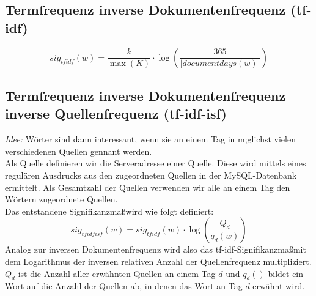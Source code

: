 \subsection{Termfrequenz inverse Dokumentenfrequenz (tf-idf)}
 \begin{equation}
sig_{tf idf}(w) = \frac{k}{\max(K)} \cdot \log ( \frac{365}{|documentdays(w)|})
\end{equation}

\subsection{Termfrequenz inverse Dokumentenfrequenz inverse Quellenfrequenz (tf-idf-isf)}
\emph{Idee: } W\"orter sind dann interessant, wenn sie an einem Tag in m;glichst vielen verschiedenen Quellen gennant werden.\\
Als Quelle definieren wir die Serveradresse einer Quelle. Diese wird mittels eines regul\"aren Ausdrucks aus den zugeordneten Quellen in der MySQL-Datenbank ermittelt. Als Gesamtzahl der Quellen verwenden wir alle an einem Tag den W\"ortern zugeordnete Quellen.\\
Das entstandene Signifikanzma\ss wird wie folgt definiert:
 \begin{equation}
sig_{tf idf isf}(w) = sig_{tf idf}(w) \cdot \log ( \frac{Q_d}{q_d(w)})
\end{equation}
Analog zur inversen Dokumentenfrequenz wird also das tf-idf-Signifikanzma\ss  mit dem Logarithmus der inversen relativen Anzahl der Quellenfrequenz multipliziert. $Q_d$ ist die Anzahl aller erw\"ahnten Quellen an einem Tag $d$ und $q_d()$ bildet ein Wort auf die Anzahl der Quellen ab, in denen das Wort an Tag $d$  erw\"ahnt wird. 

